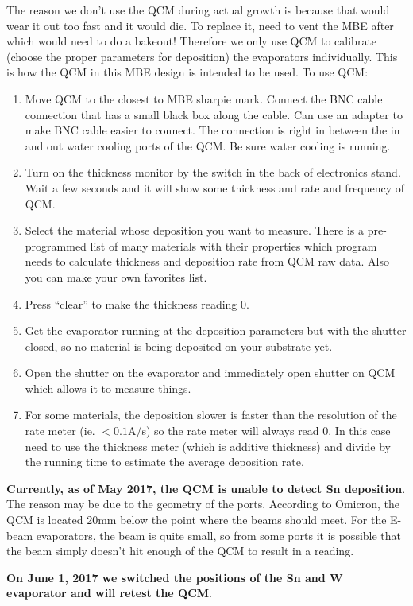 The reason we don’t use the QCM during actual growth is because that would wear it out too fast and it would die. To replace it, need to vent the MBE after which would need to do a bakeout! Therefore we only use QCM to calibrate (choose the proper parameters for deposition) the evaporators individually. This is how the QCM in this MBE design is intended to be used.
To use QCM:
\begin{enumerate}
\item	Move QCM to the closest to MBE sharpie mark. Connect the BNC cable connection that has a small black box along the cable. Can use an adapter to make BNC cable easier to connect. The connection is right in between the in and out water cooling ports of the QCM. Be sure water cooling is running.
\item	Turn on the thickness monitor by the switch in the back of electronics stand. Wait a few seconds and it will show some thickness and rate and frequency of QCM. 
\item	Select the material whose deposition you want to measure. There is a pre-programmed list of many materials with their properties which program needs to calculate thickness and deposition rate from QCM raw data. Also you can make your own favorites list.
\item	Press “clear” to make the thickness reading 0.
\item	Get the evaporator running at the deposition parameters but with the shutter closed, so no material is being deposited on your substrate yet. 
\item	Open the shutter on the evaporator and immediately open shutter on QCM which allows it to measure things.
\item	For some materials, the deposition slower is faster than the resolution of the rate meter (ie. $<0.1$A/s) so the rate meter will always read 0. In this case need to use the thickness meter (which is additive thickness) and divide by the running time to estimate the average deposition rate.
\end{enumerate}

\textbf{Currently, as of May 2017, the QCM is unable to detect Sn deposition}. The reason may be due to the geometry of the ports. According to Omicron, the QCM is located 20mm below the point where the beams should meet. For the E-beam evaporators, the beam is quite small, so from some ports it is possible that the beam simply doesn't hit enough of the QCM to result in a reading.

\textbf{On June 1, 2017 we switched the positions of the Sn and W evaporator and will retest the QCM}.
